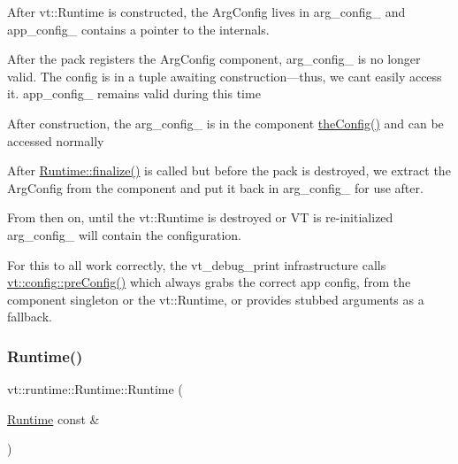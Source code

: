 \begin{DoxyItemize}
\item After {\ttfamily vt\+::\+Runtime} is constructed, the Arg\+Config lives in {\ttfamily arg\+\_\+config\+\_\+} and {\ttfamily app\+\_\+config\+\_\+} contains a pointer to the internals.
\item After the pack registers the Arg\+Config component, {\ttfamily arg\+\_\+config\+\_\+} is no longer valid. The config is in a tuple awaiting construction---thus, we can\textquotesingle{}t easily access it. app\+\_\+config\+\_\+ remains valid during this time
\item After construction, the {\ttfamily arg\+\_\+config\+\_\+} is in the component {\ttfamily \hyperlink{namespacevt_aa17c6eae35e7e41a8b11d4047b7c0839}{the\+Config()}} and can be accessed normally
\item After {\ttfamily \hyperlink{structvt_1_1runtime_1_1_runtime_ae4e8d5395c4144c3322fc689b3fb07ab}{Runtime\+::finalize()}} is called but before the pack is destroyed, we extract the {\ttfamily Arg\+Config} from the component and put it back in {\ttfamily arg\+\_\+config\+\_\+} for use after.
\item From then on, until the {\ttfamily vt\+::\+Runtime} is destroyed or VT is re-\/initialized {\ttfamily arg\+\_\+config\+\_\+} will contain the configuration.

For this to all work correctly, the {\ttfamily vt\+\_\+debug\+\_\+print} infrastructure calls {\ttfamily \hyperlink{namespacevt_1_1debug_a852027d87cfb65bb21dd8ce1e8c23c61}{vt\+::config\+::pre\+Config()}} which always grabs the correct app config, from the component singleton or the {\ttfamily vt\+::\+Runtime}, or provides stubbed arguments as a fallback. 


\end{DoxyItemize}\mbox{\label{structvt_1_1runtime_1_1_runtime_a42d87d965f2a283dbaf484b36b6a0c39}} 
\subsubsection{\texorpdfstring{Runtime()}{Runtime()}\hspace{0.1cm}{\footnotesize\ttfamily [2/3]}}
{\footnotesize\ttfamily vt\+::runtime\+::\+Runtime\+::\+Runtime (\begin{DoxyParamCaption}\item[{\hyperlink{structvt_1_1runtime_1_1_runtime}{Runtime} const \&}]{ }\end{DoxyParamCaption})\hspace{0.3cm}{\ttfamily [delete]}}

